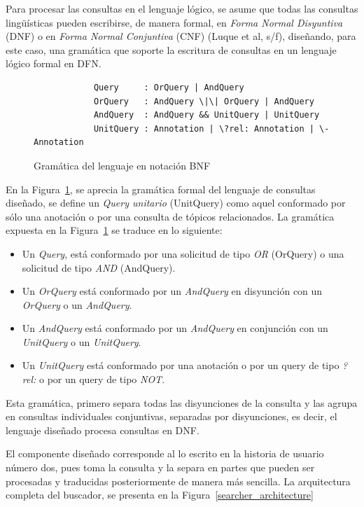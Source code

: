 \begin{itemize}
Para procesar las consultas en el lenguaje lógico, se asume que todas las consultas lingüísticas pueden escribirse, de manera formal, en \textit{Forma Normal Disyuntiva} (DNF) o en \textit{Forma Normal Conjuntiva} (CNF) (Luque et al, s/f), diseñando, para este caso, una gramática que soporte la escritura de consultas en un lenguaje lógico formal en DFN.

\begin{figure}[!h]
    \begin{center}
        \begin{verbatim} 
            Query     : OrQuery | AndQuery
            OrQuery   : AndQuery \|\| OrQuery | AndQuery
            AndQuery  : AndQuery && UnitQuery | UnitQuery
            UnitQuery : Annotation | \?rel: Annotation | \- Annotation
        \end{verbatim}
        \caption{Gramática del lenguaje en notación BNF}
        \label{BNFGrammar}
    \end{center}
\end{figure}

En la Figura~\ref{BNFGrammar}, se aprecia la gramática formal del lenguaje de consultas diseñado, se define un \textit{Query unitario} (UnitQuery) como aquel conformado por sólo una anotación o por una consulta de tópicos relacionados. La gramática expuesta en la Figura~\ref{BNFGrammar} se traduce en lo siguiente:

\begin{itemize}
    \item Un \textit{Query}, está conformado por una solicitud de tipo \textit{OR} (OrQuery) o una solicitud de tipo \textit{AND} (AndQuery).
    \item Un \textit{OrQuery} está conformado por un \textit{AndQuery} en disyunción con un \textit{OrQuery} o un \textit{AndQuery}.
    \item Un \textit{AndQuery} está conformado por un \textit{AndQuery} en conjunción con un \textit{UnitQuery} o un \textit{UnitQuery}.
    \item Un \textit{UnitQuery} está conformado por una anotación o por un query de tipo \textit{?rel:} o por un query de tipo \textit{NOT}.
\end{itemize}

Esta gramática, primero separa todas las disyunciones de la consulta y las agrupa en consultas individuales conjuntivas, separadas por disyunciones, es decir, el lenguaje diseñado procesa consultas en DNF.

El componente diseñado corresponde al lo escrito en la historia de usuario número dos, pues toma la consulta y la separa en partes que pueden ser procesadas y traducidas posteriormente de manera más sencilla. La arquitectura completa del buscador, se presenta en la Figura~\ref{searcher_architecture}


\end{itemize}
